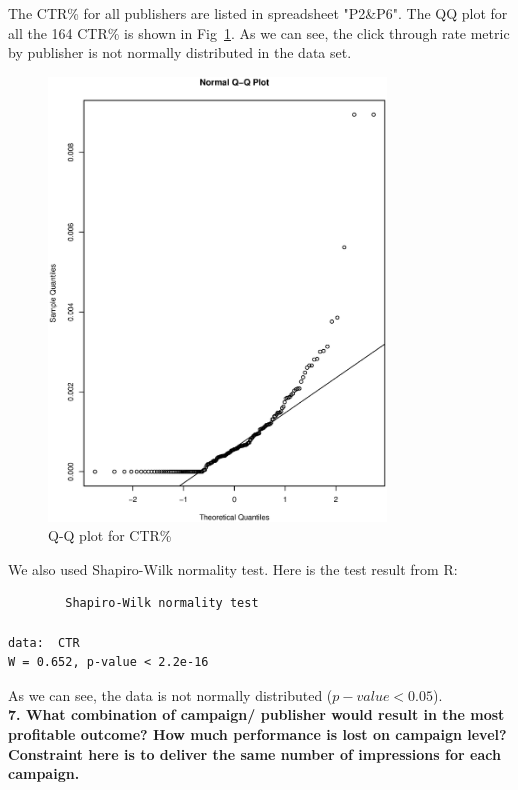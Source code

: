 \documentclass[12pt]{article}
\begin{document}
The CTR\% for all publishers are listed in spreadsheet "P2\&P6". The QQ plot for all the 164 CTR\% is shown in Fig~\ref{fig:qq}. As we can see, the click through rate metric by publisher is not normally distributed in the data set. \\

\begin{figure}[ht!]
  \centering
  \includegraphics[width=0.8\textwidth]{qq}
  \caption{Q-Q plot for CTR\% \label{fig:qq}}
\end{figure}

We also used Shapiro-Wilk normality test. Here is the test result from R:

\begin{verbatim}
        Shapiro-Wilk normality test

data:  CTR
W = 0.652, p-value < 2.2e-16
\end{verbatim}

As we can see, the data is not normally distributed ($p-value < 0.05$). \\

{\bf 7. What combination of campaign/ publisher would result in the most profitable outcome? How much performance is lost on campaign level? Constraint here is to deliver the same number of impressions for each campaign.}
\end{document}
